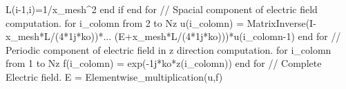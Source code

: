 \documentclass[a4paper]{article}
\begin{document}
{		\indent\indent L(i-1,i)=1/x\_mesh\string^2\newline
		\indent end if\newline
		end for\newline\newline	
		\textcolor{OliveGreen}{// Spacial component of electric field computation.}\newline
		for i\_colomn from 2 to Nz\newline
		\indent u(i\_colomn) = MatrixInverse(I-x\_mesh*L/(4*1j*ko))*...\newline
		\indent\indent\indent\indent\indent\indent\indent\indent\indent\indent\indent(E+x\_mesh*L/(4*1j*ko)))*u(i\_colomn-1)\newline
		end for\newline\newline
		\textcolor{OliveGreen}{// Periodic component of electric field in z direction computation.}\newline
		for i\_colomn from 1 to Nz\newline
		\indent f(i\_colomn) = exp(-1j*ko*z(i\_colomn))\newline
		end for\newline\newline
		\textcolor{OliveGreen}{// Complete Electric field.}\newline
		E = Elementwise\_multiplication(u,f)\newline\newline
	    }
		\newpage

	
\end{document}
